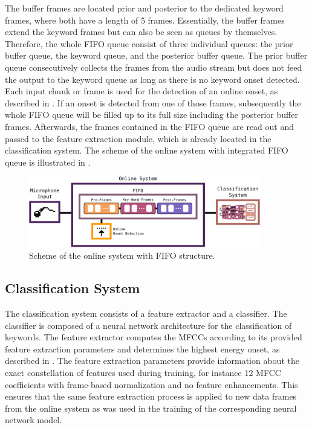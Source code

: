 The buffer frames are located prior and posterior to the dedicated keyword frames, where both have a length of 5 frames.
Essentially, the buffer frames extend the keyword frames but can also be seen as queues by themselves.
Therefore, the whole FIFO queue consist of three individual queues: the prior buffer queue, the keyword queue, and the posterior buffer queue.
The prior buffer queue consecutively collects the frames from the audio stream but does not feed the output to the keyword queue as long as there is no keyword onset detected.
Each input chunk or frame is used for the detection of an online onset, as described in .
If an onset is detected from one of those frames, subsequently the whole FIFO queue will be filled up to its full size including the posterior buffer frames.
Afterwards, the frames contained in the FIFO queue are read out and passed to the feature extraction module, which is already located in the classification system.
The scheme of the online system with integrated FIFO queue is illustrated in .
\begin{figure}[!ht]
  \centering
  \includegraphics[width=0.9\textwidth]{./6_game/figs/game_system_online.pdf}
  \caption{Scheme of the online system with FIFO structure.}
  \label{fig:game_system_online}
\end{figure}
\FloatBarrier
\noindent



\subsection{Classification System}
The classification system consists of a feature extractor and a classifier.
The classifier is composed of a neural network architecture for the classification of keywords.
The feature extractor computes the MFCCs according to its provided feature extraction parameters and determines the highest energy onset, as described in .
The feature extraction parameters provide information about the exact constellation of features used during training, for instance 12 MFCC coefficients with frame-based normalization and no feature enhancements.
This ensures that the same feature extraction process is applied to new data frames from the online system as was used in the training of the corresponding neural network model.

